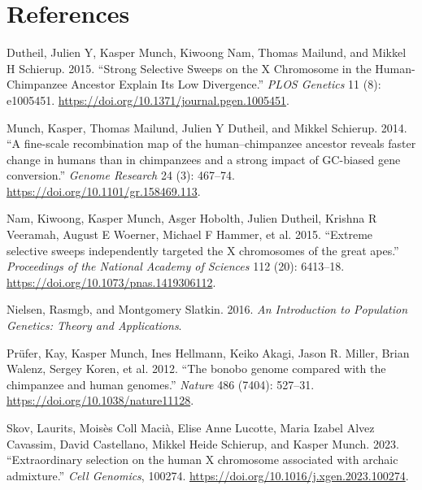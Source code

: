 \documentclass[
  10pt,
  a4paper,
]{scrbook}
\newlength{\cslhangindent}
\newenvironment{CSLReferences}[2] %
 {\begin{list}{}{%
  \setlength{\itemindent}{0pt}
  \setlength{\leftmargin}{0pt}
  \setlength{\parsep}{0pt}
  \ifodd #1
   \setlength{\leftmargin}{\cslhangindent}
   \setlength{\itemindent}{-1\cslhangindent}
  \fi
  \setlength{\itemsep}{#2\baselineskip}}}
 {\end{list}}
\let\oldemph\emph
\renewcommand\emph[1]{\oldemph{\color{gray}#1}} %
\begin{document}
\chapter{References}\label{references}

\label{refs}
\begin{CSLReferences}{1}{0}
Dutheil, Julien Y, Kasper Munch, Kiwoong Nam, Thomas Mailund, and Mikkel
H Schierup. 2015. {``{Strong Selective Sweeps on the X Chromosome in the
Human-Chimpanzee Ancestor Explain Its Low Divergence}.''} \emph{PLOS
Genetics} 11 (8): e1005451.
\url{https://doi.org/10.1371/journal.pgen.1005451}.

Munch, Kasper, Thomas Mailund, Julien Y Dutheil, and Mikkel Schierup.
2014. {``{A fine-scale recombination map of the human--chimpanzee
ancestor reveals faster change in humans than in chimpanzees and a
strong impact of GC-biased gene conversion}.''} \emph{Genome Research}
24 (3): 467--74. \url{https://doi.org/10.1101/gr.158469.113}.

Nam, Kiwoong, Kasper Munch, Asger Hobolth, Julien Dutheil, Krishna R
Veeramah, August E Woerner, Michael F Hammer, et al. 2015. {``{Extreme
selective sweeps independently targeted the X chromosomes of the great
apes}.''} \emph{Proceedings of the National Academy of Sciences} 112
(20): 6413--18. \url{https://doi.org/10.1073/pnas.1419306112}.

Nielsen, Rasmgb, and Montgomery Slatkin. 2016. \emph{An Introduction to
Population Genetics: Theory and Applications}.

Prüfer, Kay, Kasper Munch, Ines Hellmann, Keiko Akagi, Jason R. Miller,
Brian Walenz, Sergey Koren, et al. 2012. {``{The bonobo genome compared
with the chimpanzee and human genomes}.''} \emph{Nature} 486 (7404):
527--31. \url{https://doi.org/10.1038/nature11128}.

Skov, Laurits, Moisès Coll Macià, Elise Anne Lucotte, Maria Izabel Alvez
Cavassim, David Castellano, Mikkel Heide Schierup, and Kasper Munch.
2023. {``{Extraordinary selection on the human X chromosome associated
with archaic admixture}.''} \emph{Cell Genomics}, 100274.
\url{https://doi.org/10.1016/j.xgen.2023.100274}.

\end{CSLReferences}


\backmatter
\end{document}
